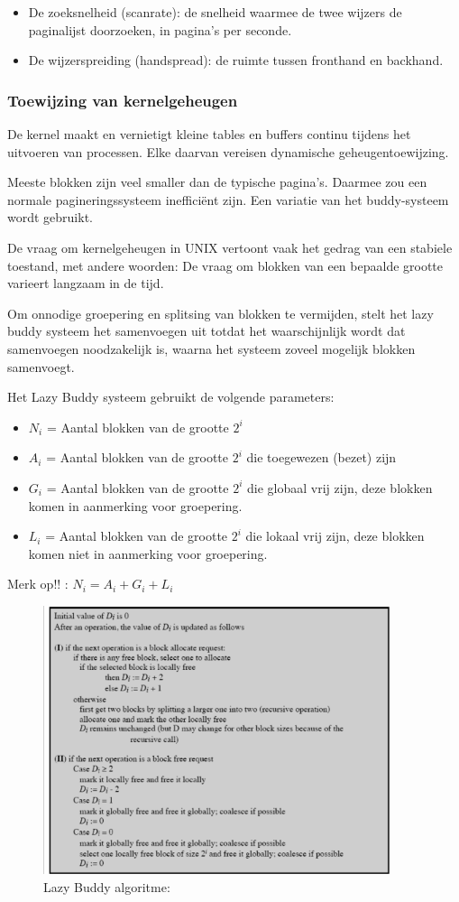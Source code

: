 \begin{itemize}
\item De zoeksnelheid (scanrate): de snelheid waarmee de twee wijzers de paginalijst doorzoeken, in pagina’s per seconde.
\item De wijzerspreiding (handspread): de ruimte tussen fronthand en backhand.
\end{itemize}


\subsubsection{Toewijzing van kernelgeheugen}

De kernel maakt en vernietigt kleine tables en buffers continu tijdens het uitvoeren van processen. Elke daarvan vereisen dynamische geheugentoewijzing.

Meeste blokken zijn veel smaller dan de typische pagina’s. Daarmee zou een normale pagineringssysteem inefficiënt zijn. Een variatie van het buddy-systeem wordt gebruikt.

De vraag om kernelgeheugen in UNIX vertoont vaak het gedrag van een stabiele toestand, met andere woorden: De vraag om blokken van een bepaalde grootte varieert langzaam in de tijd.

Om onnodige groepering en splitsing van blokken te vermijden, stelt het lazy buddy systeem het samenvoegen uit totdat het waarschijnlijk wordt dat samenvoegen noodzakelijk is, waarna het systeem zoveel mogelijk blokken samenvoegt.

Het Lazy Buddy systeem gebruikt de volgende parameters:

\begin{itemize}
\item $N_i$ = Aantal blokken van de grootte $2^i$
\item $A_i$ = Aantal blokken van de grootte $2^i$ die toegewezen (bezet) zijn
\item $G_i$ = Aantal blokken van de grootte $2^i$ die globaal vrij zijn, deze blokken komen in aanmerking voor groepering.
\item $L_i$ = Aantal blokken van de grootte $2^i$ die lokaal vrij zijn, deze blokken komen niet in aanmerking voor groepering.
\end{itemize}
Merk op!! : $N_i = A_i + G_i  + L_i$

\begin{figure}[htp]
    \centering
            \includegraphics[width=4in]{img/lazybuddy}
        \caption{Lazy Buddy algoritme:}
    \label{fig:Lazy Buddy algoritme:}
\end{figure}